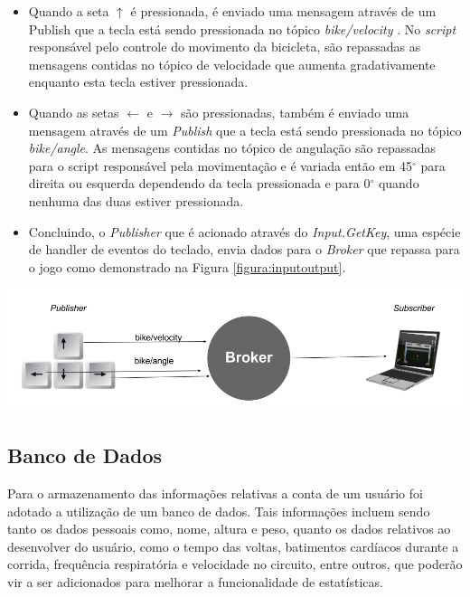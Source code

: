 \begin{itemize}
\item Quando a seta ${\uparrow}$ é pressionada, é enviado uma mensagem através de um Publish que a tecla está sendo pressionada no tópico \textit{bike/velocity} . No \textit{script} responsável pelo controle do movimento da bicicleta, são repassadas as mensagens contidas no tópico de velocidade que aumenta gradativamente enquanto esta tecla estiver pressionada.
\item Quando as setas ${\leftarrow}$ e ${\rightarrow}$ são pressionadas, também é enviado uma mensagem através de um \textit{Publish} que a tecla está sendo pressionada no tópico \textit{bike/angle}. As mensagens contidas no tópico de angulação são repassadas para o script responsável pela movimentação e é variada então em 45$^{\circ}$  para direita ou esquerda dependendo da tecla pressionada e para 0$^{\circ}$  quando nenhuma das duas estiver pressionada.
\item Concluindo, o \textit{Publisher} que é acionado através do \textit{Input.GetKey}, uma espécie de handler de eventos do teclado,  envia dados para o \textit{Broker} que repassa para o jogo como demonstrado na Figura \ref{figura:inputoutput}.
\end{itemize}

\begin{center}
	\includegraphics[scale=0.4]{figuras/inputoutp}
	\label{figura:inputoutput}
\end{center}

\subsection{Banco de Dados}
Para o armazenamento das informações relativas a conta de um usuário foi adotado a utilização de um banco de dados. Tais informações incluem sendo tanto os dados pessoais como, nome, altura e peso, quanto os dados relativos ao desenvolver do usuário, como o tempo das voltas, batimentos cardíacos durante a corrida, frequência respiratória e velocidade no circuito, entre outros, que poderão vir a ser adicionados para melhorar a funcionalidade de estatísticas.

